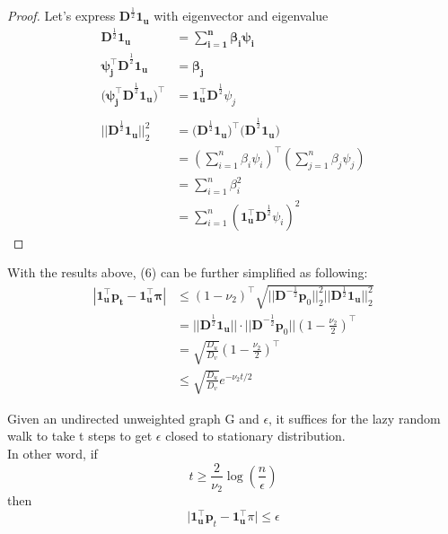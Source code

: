 \documentclass[11pt]{article}
\begin{document}
\begin{proof}
Let's express $\mathbf{D}^{\frac{1}{2}}\mathbf{1_u}$ with eigenvector and eigenvalue
\begin{equation}
    \begin{split}
         \mathbf{D}^{\frac{1}{2}}\mathbf{1_u}
         &\mathbf{= \sum_{i=1}^{n} \beta_i\psi_i}\\
         \mathbf{\psi_j^\top D}^{\frac{1}{2}}\mathbf{1_u}
         &= \mathbf{\beta_j}\\
         \mathbf{(\psi_j^\top D}^{\frac{1}{2}}\mathbf{1_u)^\top } 
         &\mathbf{= 1_u^\top D}^{\frac{1}{2}}\psi_j \\
         \\
         \mathbf{||D}^{\frac{1}{2}}\mathbf{1_u}||^2_2 
         &\mathbf{= (D}^{\frac{1}{2}}\mathbf{1_u)^\top (D}^{\frac{1}{2}}\mathbf{1_u)}\\
         &=(\sum_{i=1}^{n}\beta_i\psi_i)^\top (\sum_{j=1}^{n}\beta_j\psi_j)\\
         &=\sum_{i=1}^{n}\beta_i^2 \\
         &= \sum_{i=1}^{n}(\mathbf{1_u^\top D}^{\frac{1}{2}}\psi_i)^2
    \end{split}
\end{equation}    
\end{proof}
With the results above, (6) can be further simplified as following:
\begin{equation}
    \begin{split}
        \mathbf{|1_u^\top p_t - 1_u^\top \pi|} 
        &\leq (1-\nu_2)^\top \sqrt{||\mathbf{D}^{-\frac{1}{2}}\mathbf{p}_0||^2_2||\mathbf{D}^{\frac{1}{2}}\mathbf{1_u}||^2_2}\\
        &\mathbf{=||D}^{\frac{1}{2}}\mathbf{1_u||\cdot||D}^{-\frac{1}{2}}\mathbf{p}_0||(1-\frac{\nu_2}{2})^\top \\
        &=\sqrt{\frac{D_u}{D_v}}(1-\frac{\nu_2}{2})^\top \\
        &\leq \sqrt{\frac{D_u}{D_v}}e^{-\nu_2t/2}
    \end{split}
\end{equation}

\begin{theorem}
Given an undirected unweighted graph G and $\epsilon$, it suffices for the lazy random walk to take t steps to get $\epsilon$ closed to stationary distribution.\\
In other word, if\\
$$t \geq \frac{2}{\nu_2}\log(\frac{n}{\epsilon})$$ 
then 
$$\mathbf{|1_u^\top p}_t - \mathbf{1_u^\top }\pi| \leq \epsilon$$
\end{theorem}
\end{document}
